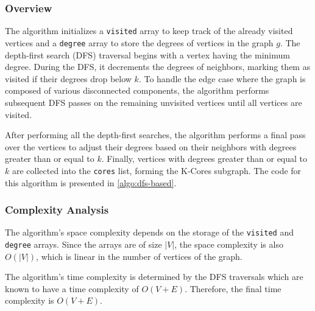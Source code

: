 \subsubsection{Overview}

The algorithm initializes a \texttt{visited} array to keep track of the already visited vertices and a \texttt{degree} array to store the degrees of vertices in the graph \(g\). The depth-first search (DFS) traversal begins with a vertex having the minimum degree. During the DFS, it decrements the degrees of neighbors, marking them as visited if their degrees drop below \(k\). To handle the edge case where the graph is composed of various disconnected components, the algorithm performs subsequent DFS passes on the remaining unvisited vertices until all vertices are visited.
    
After performing all the depth-first searches, the algorithm performs a final pass over the vertices to adjust their degrees based on their neighbors with degrees greater than or equal to \(k\). Finally, vertices with degrees greater than or equal to \(k\) are collected into the \texttt{cores} list, forming the K-Cores subgraph. The code for this algorithm is presented in \ref{algo:dfs-based}.



\subsubsection{Complexity Analysis}

The algorithm's space complexity depends on the storage of the \texttt{visited} and \texttt{degree} arrays. Since the arrays are of size \(|V|\), the space complexity is also \(O(|V|)\), which is linear in the number of vertices of the graph.

The algorithm's time complexity is determined by the DFS traversals which are known to have a time complexity of \(O(V + E)\). Therefore, the final time complexity is \(O(V + E)\).
    
    